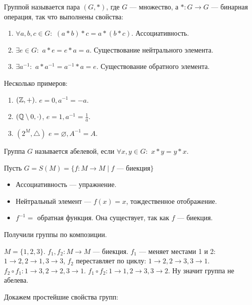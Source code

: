  \begin{definition}
     Группой называется пара $(G, \ast)$, где  $G$ --- множество, а  $\ast: G \to G$ --- бинарная операция, так что выполнены свойства:
     \begin{enumerate}
         \item $\forall a,b,c \in G:$  $(a \ast b) \ast c = a \ast (b \ast c)$. Ассоциативность.
         \item $\exists e \in G:$ $a \ast e = e \ast a = a$. Существование нейтрального элемента.
         \item $\exists a^{-1}:$  $a \ast a^{-1} = a^{-1} \ast a = e$. Существование обратного элемента.
     \end{enumerate}
 \end{definition}
\slashn
Несколько примеров:
\begin{enumerate}
    \item $(\mathbb{Z}, +)$.  $e=0, a^{-1}=-a$.
    \item  $(\mathbb{Q} \setminus 0, \cdot)$,  $e=1, a^{-1}= \frac{1}{a}$.
    \item $(2^M, \bigtriangleup)$ $e=\varnothing, A^{-1} = A$.
\end{enumerate}
\begin{definition}
    Группа $G$ называется абелевой, если  $\forall x, y \in G:$ $x \ast y = y \ast x$.
\end{definition}
\begin{example}
    Пусть $G=S(M) = \{f: M \to M \mid f\text{ --- биекция}\}$
    \begin{itemize}
    \item Ассоциативность --- упражнение.
    \item Нейтральный элемент --- $f(x) = x$, тождественное отображение.
    \item  $f^{-1}=$ обратная функция. Она существует, так как $f$ --- биекция. 
    \end{itemize}
    \slashn
    Получили группы по композиции.
\end{example}
\begin{example}
    $M=\{1,2,3\}$.  $f_1, f_2: M \to M$ --- биекция.  $f_1$ --- меняет местами  1 и 2: $1 \to 2, 2 \to 1, 3 \to 3$,  $f_2$ переставляет по циклу: $1 \to 2, 2 \to 3, 3 \to 1$. $f_2 \circ f_1: 1 \to 3, 2\to 2, 3\to 1$. $f_1 \circ f_2: 1 \to 1, 2 \to 3, 3 \to 2$. Ну значит группа не абелева.
\end{example}
\slashn
Докажем простейшие свойства групп:
